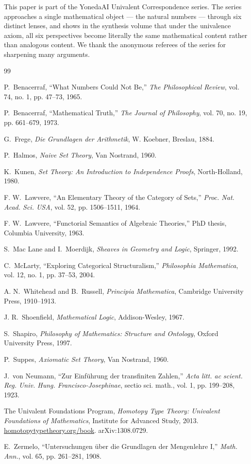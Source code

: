\documentclass[12pt]{article}
\theoremstyle{definition}
\theoremstyle{remark}
\begin{document}
This paper is part of the YonedaAI Univalent Correspondence series. The
series approaches a single mathematical object --- the natural numbers ---
through six distinct lenses, and shows in the synthesis volume that under
the univalence axiom, all six perspectives become literally the same
mathematical content rather than analogous content. We thank the
anonymous referees of the series for sharpening many arguments.

\begin{thebibliography}{99}

P.~Benacerraf, ``What Numbers Could Not Be,''
\emph{The Philosophical Review}, vol. 74, no. 1, pp. 47--73, 1965.

P.~Benacerraf, ``Mathematical Truth,''
\emph{The Journal of Philosophy}, vol. 70, no. 19, pp. 661--679, 1973.

G.~Frege, \emph{Die Grundlagen der Arithmetik},
W. Koebner, Breslau, 1884.

P.~Halmos, \emph{Naive Set Theory},
Van Nostrand, 1960.

K.~Kunen, \emph{Set Theory: An Introduction to Independence Proofs},
North-Holland, 1980.

F. W.~Lawvere, ``An Elementary Theory of the Category of Sets,''
\emph{Proc. Nat. Acad. Sci. USA}, vol. 52, pp. 1506--1511, 1964.

F. W.~Lawvere, ``Functorial Semantics of Algebraic Theories,''
PhD thesis, Columbia University, 1963.

S.~Mac Lane and I.~Moerdijk, \emph{Sheaves in Geometry and Logic},
Springer, 1992.

C.~McLarty, ``Exploring Categorical Structuralism,''
\emph{Philosophia Mathematica}, vol. 12, no. 1, pp. 37--53, 2004.

A. N.~Whitehead and B.~Russell, \emph{Principia Mathematica}, Cambridge
University Press, 1910--1913.

J. R.~Shoenfield, \emph{Mathematical Logic},
Addison-Wesley, 1967.

S.~Shapiro, \emph{Philosophy of Mathematics: Structure and Ontology},
Oxford University Press, 1997.

P.~Suppes, \emph{Axiomatic Set Theory},
Van Nostrand, 1960.

J.~von Neumann, ``Zur Einf\"uhrung der transfiniten Zahlen,''
\emph{Acta litt. ac scient. Reg. Univ. Hung. Francisco-Josephinae},
sectio sci. math., vol. 1, pp. 199--208, 1923.

The Univalent Foundations Program, \emph{Homotopy Type Theory: Univalent
Foundations of Mathematics}, Institute for Advanced Study, 2013.
\href{https://homotopytypetheory.org/book}{homotopytypetheory.org/book}.
arXiv:1308.0729.

E.~Zermelo, ``Untersuchungen \"uber die Grundlagen der Mengenlehre I,''
\emph{Math. Ann.}, vol. 65, pp. 261--281, 1908.

\end{thebibliography}
\end{document}
